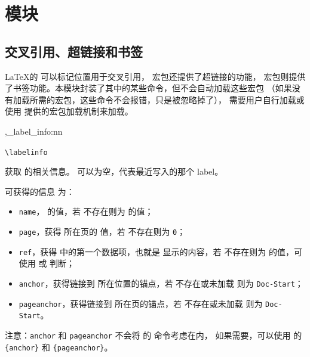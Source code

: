 \documentclass{cusdoc}
\begin{document}
\section{模块}\label{sec:module-util}

\subsection{交叉引用、超链接和书签}

\LaTeX 的  可以标记位置用于交叉引用， 宏包还提供了超链接的功能， 宏包则提供了书签功能。本模块封装了其中的某些命令，但不会自动加载这些宏包
（如果没有加载所需的宏包，这些命令不会报错，只是被忽略掉了），
需要用户自行加载或使用 \CusTeX 提供的宏包加载机制来加载。

\begin{function}[EXP]{,\cus_label_info:nn}
  \begin{syntax}
    \verb|\labelinfo|  
  \end{syntax}
获取  的相关信息。 可以为空，代表最近写入的那个 label。

可获得的信息  为：
\begin{itemize}[nosep]
  \item \texttt{name}， 的值，若  不存在则为  的值；
  \item \texttt{page}，获得  所在页的  值，若  不存在则为 \texttt{0}；
  \item \texttt{ref}，获得  中的第一个数据项，也就是  显示的内容，若  不存在则为  的值，可使用  或  判断；
  \item \texttt{anchor}，获得链接到  所在位置的锚点，若  不存在或未加载  则为 \texttt{Doc-Start}；
  \item \texttt{pageanchor}，获得链接到  所在页的锚点，若  不存在或未加载  则为 \texttt{Doc-Start}。
\end{itemize}

注意：\texttt{anchor} 和 \texttt{pageanchor} 不会将  的 
 命令考虑在内，
如果需要，可以使用  的 \texttt{\{anchor\}} 和 
\texttt{\{pageanchor\}}。
\end{function}
\end{document}
